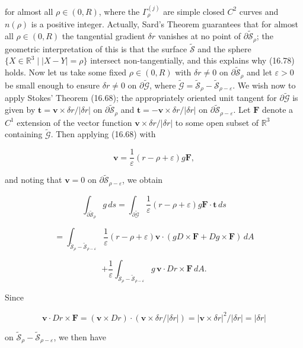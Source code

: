 for almost all $\rho \in (0, R)$, where the $\Gamma_{\rho}^{(j)}$ are simple closed $C^{2}$ curves and $n(\rho)$ is a positive integer. Actually, Sard's Theorem guarantees that for almost all $\rho \in (0, R)$ the tangential gradient $\delta r$ vanishes at no point of $\partial \widetilde{\mathscr{S}}_{\rho}$; the geometric interpretation of this is that the surface $\widetilde{\mathscr{S}}$ and the sphere $\{X \in \mathbb{R}^{3}\mid |X-Y|=\rho\}$ intersect non-tangentially, and this explains why (16.78) holds. Now let us take some fixed $\rho \in (0, R)$ with $\delta r \neq 0$ on $\partial \widetilde{\mathscr{S}}_{\rho}$ and let $\varepsilon > 0$ be small enough to ensure $\delta r \neq 0$ on $\partial \widetilde{\mathscr{G}}$, where $\widetilde{\mathscr{G}} = \widetilde{\mathscr{S}}_{\rho} - \widetilde{\mathscr{S}}_{\rho-\varepsilon}$. We wish now to apply Stokes' Theorem (16.68); the appropriately oriented unit tangent for $\partial \widetilde{\mathscr{G}}$ is given by $\mathbf{t}=\mathbf{v}\times \delta r/|\delta r|$ on $\partial \widetilde{\mathscr{S}}_{\rho}$ and $\mathbf{t}=-\mathbf{v}\times \delta r/|\delta r|$ on $\partial \widetilde{\mathscr{S}}_{\rho-\varepsilon}$. Let $\mathbf{F}$ denote a $C^{1}$ extension of the vector function $\mathbf{v}\times \delta r/|\delta r|$ to some open subset of $\mathbb{R}^{3}$ containing $\widetilde{\mathscr{G}}$. Then applying (16.68) with

\[
\mathbf{v}=\frac{1}{\varepsilon}(r-\rho+\varepsilon)g\mathbf{F},
\]

and noting that $\mathbf{v}=0$ on $\partial \widetilde{\mathscr{S}}_{\rho-\varepsilon}$, we obtain

\[
\int_{\partial \widetilde{\mathscr{S}}_{\rho}} g\,ds
= \int_{\partial \widetilde{\mathscr{G}}} \frac{1}{\varepsilon}(r-\rho+\varepsilon)g\mathbf{F}\cdot \mathbf{t}\,ds
\]

\[
= \int_{\widetilde{\mathscr{S}}_{\rho}-\widetilde{\mathscr{S}}_{\rho-\varepsilon}}
\frac{1}{\varepsilon}(r-\rho+\varepsilon)\mathbf{v}\cdot(gD\times \mathbf{F}+Dg\times \mathbf{F})\,dA
\]

\[
+ \frac{1}{\varepsilon}\int_{\widetilde{\mathscr{S}}_{\rho}-\widetilde{\mathscr{S}}_{\rho-\varepsilon}}
g\,\mathbf{v}\cdot D r\times \mathbf{F}\,dA.
\]

Since

\[
\mathbf{v}\cdot D r\times \mathbf{F}=(\mathbf{v}\times D r)\cdot(\mathbf{v}\times \delta r/|\delta r|)
=|\mathbf{v}\times \delta r|^{2}/|\delta r|=|\delta r|
\]

on $\widetilde{\mathscr{S}}_{\rho}-\widetilde{\mathscr{S}}_{\rho-\varepsilon}$, we then have

